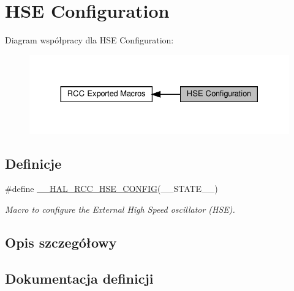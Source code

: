 \hypertarget{group___r_c_c___h_s_e___configuration}{}\section{H\+SE Configuration}
\label{group___r_c_c___h_s_e___configuration}
Diagram współpracy dla H\+SE Configuration\+:\nopagebreak
\begin{figure}[H]
\begin{center}
\leavevmode
\includegraphics[width=330pt]{group___r_c_c___h_s_e___configuration}
\end{center}
\end{figure}
\subsection*{Definicje}
\begin{DoxyCompactItemize}
\item 
\#define \hyperlink{group___r_c_c___h_s_e___configuration_gaa3d98648399f15d02645ef84f6ca8e4b}{\+\_\+\+\_\+\+H\+A\+L\+\_\+\+R\+C\+C\+\_\+\+H\+S\+E\+\_\+\+C\+O\+N\+F\+IG}(\+\_\+\+\_\+\+S\+T\+A\+T\+E\+\_\+\+\_\+)
\begin{DoxyCompactList}\small\item\em Macro to configure the External High Speed oscillator (H\+SE). \end{DoxyCompactList}\end{DoxyCompactItemize}


\subsection{Opis szczegółowy}


\subsection{Dokumentacja definicji}
\mbox{\label{group___r_c_c___h_s_e___configuration_gaa3d98648399f15d02645ef84f6ca8e4b}} 
